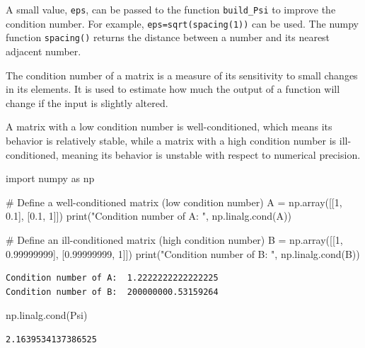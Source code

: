 \documentclass[
  letterpaper,
  DIV=11,
  numbers=noendperiod]{scrreprt}
\newenvironment{Shaded}{\begin{snugshade}}{\end{snugshade}}
\newcommand{\BuiltInTok}[1]{\textcolor[rgb]{0.00,0.23,0.31}{#1}}
\newcommand{\CommentTok}[1]{\textcolor[rgb]{0.37,0.37,0.37}{#1}}
\newcommand{\DecValTok}[1]{\textcolor[rgb]{0.68,0.00,0.00}{#1}}
\newcommand{\FloatTok}[1]{\textcolor[rgb]{0.68,0.00,0.00}{#1}}
\newcommand{\ImportTok}[1]{\textcolor[rgb]{0.00,0.46,0.62}{#1}}
\newcommand{\NormalTok}[1]{\textcolor[rgb]{0.00,0.23,0.31}{#1}}
\newcommand{\OperatorTok}[1]{\textcolor[rgb]{0.37,0.37,0.37}{#1}}
\newcommand{\StringTok}[1]{\textcolor[rgb]{0.13,0.47,0.30}{#1}}
\begin{document}
A small value, \texttt{eps}, can be passed to the function
\texttt{build\_Psi} to improve the condition number. For example,
\texttt{eps=sqrt(spacing(1))} can be used. The numpy function
\texttt{spacing()} returns the distance between a number and its nearest
adjacent number.

The condition number of a matrix is a measure of its sensitivity to
small changes in its elements. It is used to estimate how much the
output of a function will change if the input is slightly altered.

A matrix with a low condition number is well-conditioned, which means
its behavior is relatively stable, while a matrix with a high condition
number is ill-conditioned, meaning its behavior is unstable with respect
to numerical precision.

\begin{Shaded}
\begin{Highlighting}[]
\ImportTok{import}\NormalTok{ numpy }\ImportTok{as}\NormalTok{ np}

\CommentTok{\# Define a well{-}conditioned matrix (low condition number)}
\NormalTok{A }\OperatorTok{=}\NormalTok{ np.array([[}\DecValTok{1}\NormalTok{, }\FloatTok{0.1}\NormalTok{], [}\FloatTok{0.1}\NormalTok{, }\DecValTok{1}\NormalTok{]])}
\BuiltInTok{print}\NormalTok{(}\StringTok{"Condition number of A: "}\NormalTok{, np.linalg.cond(A))}

\CommentTok{\# Define an ill{-}conditioned matrix (high condition number)}
\NormalTok{B }\OperatorTok{=}\NormalTok{ np.array([[}\DecValTok{1}\NormalTok{, }\FloatTok{0.99999999}\NormalTok{], [}\FloatTok{0.99999999}\NormalTok{, }\DecValTok{1}\NormalTok{]])}
\BuiltInTok{print}\NormalTok{(}\StringTok{"Condition number of B: "}\NormalTok{, np.linalg.cond(B))}
\end{Highlighting}
\end{Shaded}

\begin{verbatim}
Condition number of A:  1.2222222222222225
Condition number of B:  200000000.53159264
\end{verbatim}

\begin{Shaded}
\begin{Highlighting}[]
\NormalTok{np.linalg.cond(Psi)}
\end{Highlighting}
\end{Shaded}

\begin{verbatim}
2.1639534137386525
\end{verbatim}
\end{document}
